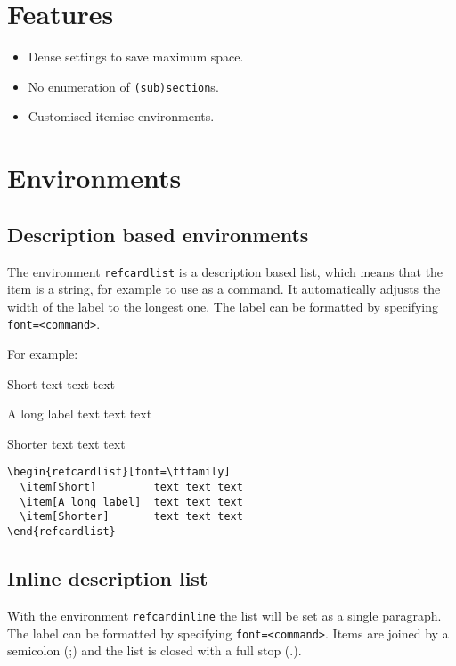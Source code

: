 \documentclass[   %
  final,          %
  a4paper,        %
  columns=3,       %
  margin=1.0cm,   %
]{refcard}
\begin{document}
\section{Features}

\begin{itemize}
\item Dense settings to save maximum space.
\item No enumeration of \lstinline`(sub)section`s.
\item Customised itemise environments.
\end{itemize}

\section{Environments}

\subsection{Description based environments}

The environment \lstinline`refcardlist` is a description based list,
which means that the item is a string, for example to use as a command.
It automatically adjusts the width of the label to the longest one.
The label can be formatted by specifying \lstinline`font=<command>`.

For example:
\begin{refcardlist}[font=\ttfamily]
  \item[Short]         text text text
  \item[A long label]  text text text
  \item[Shorter]       text text text
\end{refcardlist}

\begin{lstlisting}
\begin{refcardlist}[font=\ttfamily]
  \item[Short]         text text text
  \item[A long label]  text text text
  \item[Shorter]       text text text
\end{refcardlist}
\end{lstlisting}

\subsection{Inline description list}

With the environment \lstinline`refcardinline` the list will be
set as a single paragraph.
The label can be formatted by specifying \lstinline`font=<command>`.
Items are joined by a semicolon (;) and the list is closed with a full stop (.).
\end{document}
